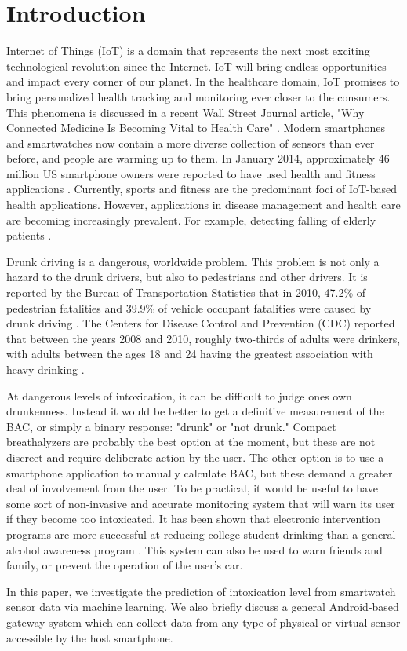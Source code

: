 \section{Introduction}
Internet of Things (IoT) is a domain that represents the next most exciting technological revolution since the Internet. IoT will bring endless opportunities and impact every corner of our planet. In the healthcare domain, IoT promises to bring personalized health tracking and monitoring ever closer to the consumers. This phenomena is discussed in a recent Wall Street Journal article, "Why Connected Medicine Is Becoming Vital to Health Care" \cite{Landro:2015}. Modern smartphones and smartwatches now contain a more diverse collection of sensors than ever before, and people are warming up to them. In January 2014, approximately 46 million US smartphone owners were reported to have used health and fitness applications \cite{Nielsen:2014}. Currently, sports and fitness are the predominant foci of IoT-based health applications. However, applications in disease management and health care are becoming increasingly prevalent. For example, detecting falling of elderly patients \cite{Tacconi:2011}. 

Drunk driving is a dangerous, worldwide problem. This problem is not only a hazard to the drunk drivers, but also to pedestrians and other drivers. It is reported by the Bureau of Transportation Statistics that in 2010, 47.2\% of pedestrian fatalities and 39.9\% of vehicle occupant fatalities were caused by drunk driving \cite{Chambers:2012}. The Centers for Disease Control and Prevention (CDC) reported that between the years 2008 and 2010, roughly two-thirds of adults were drinkers, with adults between the ages 18 and 24 having the greatest association with heavy drinking \cite{Schoenborn:2013}. 

At dangerous levels of intoxication, it can be difficult to judge ones own drunkenness. Instead it would be better to get a definitive measurement of the BAC, or simply a binary response: "drunk" or "not drunk." Compact breathalyzers are probably the best option at the moment, but these are not discreet and require deliberate action by the user. The other option is to use a smartphone application to manually calculate BAC, but these demand a greater deal of involvement from the user. To be practical, it would be useful to have some sort of non-invasive and accurate monitoring system that will warn its user if they become too intoxicated. It has been shown that electronic intervention programs are more successful at reducing college student drinking than a general alcohol awareness program \cite{Ward:2015}. This system can also be used to warn friends and family, or prevent the operation of the user's car.

In this paper, we investigate the prediction of intoxication level from smartwatch sensor data via machine learning. We also briefly discuss a general Android-based gateway system which can collect data from any type of physical or virtual sensor accessible by the host smartphone. 